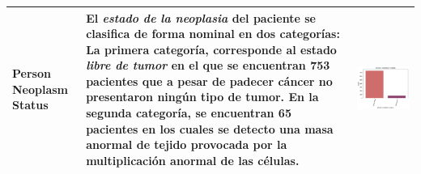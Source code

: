 \begin{table}[!htb]
\begin{threeparttable}
\begin{tabular}{p{2.5cm} p{7cm} p{6.5cm}}
			Person Neoplasm Status
			& El \textit{estado de la neoplasia} del paciente se clasifica de forma nominal en dos categorías: La primera categoría, corresponde al estado \textit{libre de tumor} en el que se encuentran 753 pacientes que a pesar de padecer cáncer no presentaron ningún tipo de tumor. En la segunda categoría, se encuentran 65 pacientes en los cuales se detecto una masa anormal de tejido provocada por la multiplicación anormal de las células.
			& \begin{center}\includegraphics[width=1\linewidth]{NOTEBOOK/IMAGENES_DESCRIPTIVAS/43_person_neoplasm_status}\end{center}
			\\ \hline
			
		\end{tabular}
	\end{threeparttable}
\end{table}
